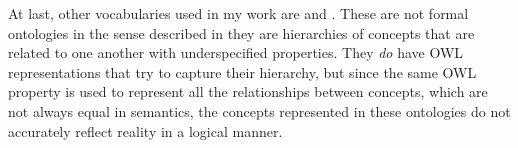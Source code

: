 At last, other vocabularies used in my work are  and . These are not formal ontologies in the sense described in  \mdash they are hierarchies of concepts that are related to one another with underspecified properties. They \emph{do} have OWL representations that try to capture their hierarchy, but since the same OWL property is used to represent all the relationships between concepts, which are not always equal in semantics, the concepts represented in these ontologies do not accurately reflect reality in a logical manner.
